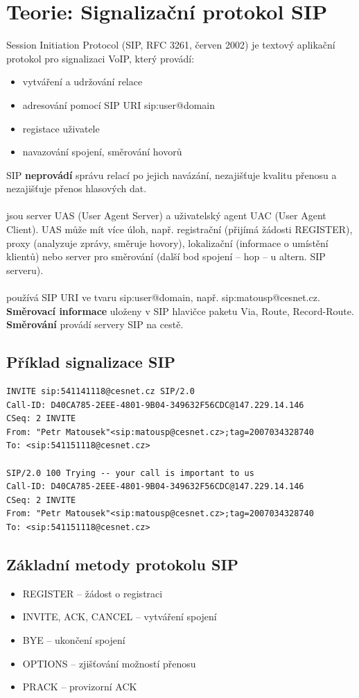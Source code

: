 
\section{Teorie: Signalizační protokol SIP}
\label{sip}
Session Initiation Protocol (SIP, RFC 3261, červen 2002) je textový aplikační protokol pro signalizaci VoIP, který provádí:
\begin{itemize}
    \item vytváření a udržování relace
    \item adresování pomocí SIP URI sip:user@domain
    \item registace uživatele
    \item navazování spojení, směrování hovorů
\end{itemize}

\noindent SIP {\bf neprovádí} správu relací po jejich navázání, nezajišťuje kvalitu přenosu a nezajišťuje přenos hlasových dat. \\
~\\
 jsou server UAS (User Agent Server) a uživatelský agent UAC (User Agent Client). UAS může mít více úloh,
např. registrační (přijímá žádosti REGISTER), proxy (analyzuje zprávy, směruje hovory), lokalizační (informace o umístění klientů)
nebo server pro směrování (další bod spojení – hop – u altern. SIP serveru). \\
~\\
 používá SIP URI ve tvaru sip:user@domain, např. sip:matousp@cesnet.cz. {\bf Směrovací informace} uloženy v SIP
hlavičce paketu Via, Route, Record-Route. {\bf Směrování} provádí servery SIP na cestě.

\subsection*{Příklad signalizace SIP}
\begin{lstlisting}
INVITE sip:541141118@cesnet.cz SIP/2.0
Call-ID: D40CA785-2EEE-4801-9B04-349632F56CDC@147.229.14.146
CSeq: 2 INVITE
From: "Petr Matousek"<sip:matousp@cesnet.cz>;tag=2007034328740
To: <sip:541151118@cesnet.cz>

SIP/2.0 100 Trying -- your call is important to us
Call-ID: D40CA785-2EEE-4801-9B04-349632F56CDC@147.229.14.146
CSeq: 2 INVITE
From: "Petr Matousek"<sip:matousp@cesnet.cz>;tag=2007034328740
To: <sip:541151118@cesnet.cz>
\end{lstlisting}

\subsection*{Základní metody protokolu SIP}
\begin{itemize}
    \item REGISTER – žádost o registraci
    \item INVITE, ACK, CANCEL – vytváření spojení
    \item BYE – ukončení spojení
    \item OPTIONS – zjišťování možností přenosu
    \item PRACK – provizorní ACK
\end{itemize}

